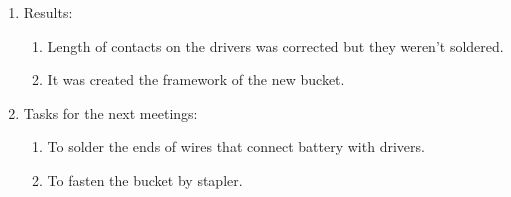 \begin{enumerate}
\begin{enumerate}
	\end{enumerate}
	\item Results:
	\begin{enumerate}
		\item Length of contacts on the drivers was corrected but they weren't soldered.
		
		\item It was created the framework of the new bucket.
		

	\end{enumerate}
	
	\item Tasks for the next meetings:
	\begin{enumerate}
		\item To solder the ends of wires that connect battery with drivers.
		
		\item To fasten the bucket by stapler.
		
	\end{enumerate}
	
\end{enumerate}
\fillpage